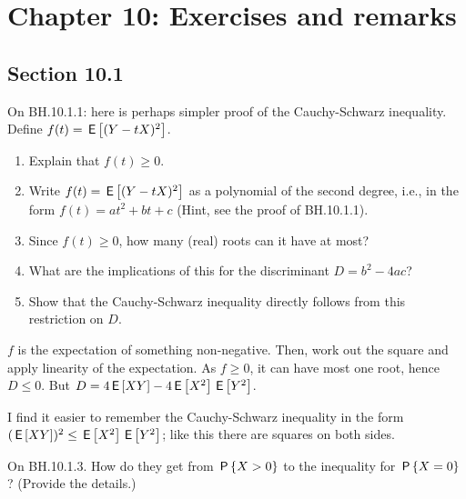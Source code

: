 


\chapter{Chapter 10: Exercises and remarks}


\section{Section 10.1}


\begin{exercise}
On BH.10.1.1:  here is perhaps simpler proof of the Cauchy-Schwarz inequality.  Define  $f(t) = \E{(Y-tX)^2}$.
\begin{enumerate}
\item Explain that $f(t)\geq 0$.
\item Write $f(t) = \E{(Y-tX)^2}$ as a polynomial of the second degree, i.e., in the form $f(t) = a t^2 + b t + c$  (Hint, see the proof of BH.10.1.1).
\item Since $f(t) \geq 0$, how many (real) roots can it have at most?
\item What are the implications of this for the discriminant $D=b^2-4ac$?
\item Show that the Cauchy-Schwarz inequality directly follows from this restriction on $D$.
\end{enumerate}
\begin{solution}
$f$ is the expectation of something non-negative. Then, work out the square and apply linearity of the expectation. As $f\geq 0$, it can have most one root, hence $D\leq 0$. But $D=4\E{XY} - 4\E{X^{2}}\E{Y^{2}}$.
\end{solution}
\end{exercise}

\begin{remark}
I find it easier to remember the Cauchy-Schwarz inequality in the form $(\E{XY})^2 \leq \E{X^2}\E{Y^2}$; like this there are squares on both sides.
\end{remark}

\begin{exercise}
On BH.10.1.3. How do they get from $\P{X>0}$ to the inequality for $\P{X=0}$? (Provide the details.)
\begin{hint}
\end{hint}
\begin{solution}
\end{solution}
\end{exercise}

